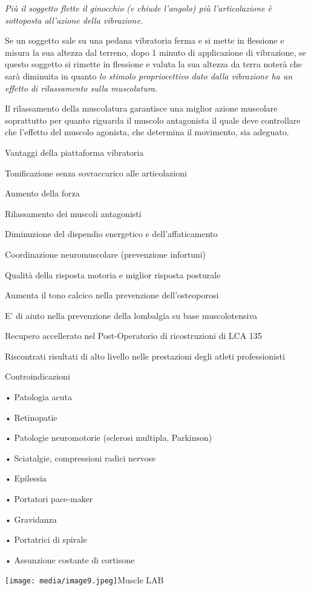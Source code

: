 \documentclass[]{article}
\begin{document}
\emph{Più il soggetto flette il ginocchio (e chiude l'angolo) più
l'articolazione è sottoposta all'azione della vibrazione. }

Se un soggetto sale su una pedana vibratoria ferma e si mette in
flessione e misura la sua altezza dal terreno, dopo 1 minuto di
applicazione di vibrazione, se questo soggetto si rimette in flessione e
valuta la sua altezza da terra noterà che sarà diminuita in quanto
\emph{lo stimolo propriocettivo dato dalla vibrazione ha un effetto di
rilassamento sulla muscolatura.}

Il rilassamento della muscolatura garantisce una miglior azione
muscolare soprattutto per quanto riguarda il muscolo antagonista il
quale deve controllare che l'effetto del muscolo agonista, che determina
il movimento, sia adeguato.

Vantaggi della piattaforma vibratoria

Tonificazione senza sovraccarico alle articolazioni

Aumento della forza

Rilassamento dei muscoli antagonisti

Diminuzione del dispendio energetico e dell'affaticamento

Coordinazione neuromuscolare (prevenzione infortuni)

Qualità della risposta motoria e miglior risposta posturale

Aumenta il tono calcico nella prevenzione dell'osteoporosi

E' di aiuto nella prevenzione della lombalgia su base muscolotensiva

Recupero accellerato nel Post-Operatorio di ricostruzioni di LCA 135

Riscontrati risultati di alto livello nelle prestazioni degli atleti
professionisti

Controindicazioni

• Patologia acuta

• Retinopatie

• Patologie neuromotorie (sclerosi multipla, Parkinson)

• Sciatalgie, compressioni radici nervose

• Epilessia

• Portatori pace-maker

• Gravidanza

• Portatrici di spirale

• Assunzione costante di cortisone

\texttt{[image: media/image9.jpeg]}Muscle
LAB
\end{document}
